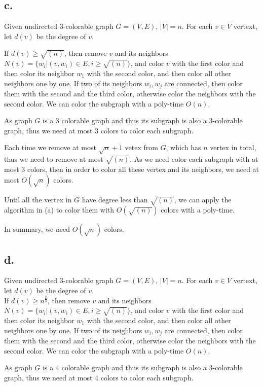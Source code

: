 \documentclass[a4paper,12pt]{article}
\begin{document}
\subsection*{c.}
Given undirected 3-colorable graph $G=(V,E)$,  $|V|=n$.
For each $v \in V$ vertext, let $d(v)$ be the degree of $v$.

If $d(v)\geq \sqrt{(n)}$, then remove $v$ and its neighbors $N(v)=\{w_i| (v,w_i) \in E, i\geq \sqrt{(n)}\}$, and color $v$ with the first color and then color its neighbor $w_1$ with the second color, and then color all other neighbors one by one. If two of its neighbors $w_i, w_j$ are connected, then color them with the second and the third color, otherwise color the neighbors with the second color. We can color the subgraph with a poly-time $O(n)$.

As graph $G$ is a 3 colorable graph and thus its subgraph is also a 3-colorable graph, thus we need at most 3 colors to color each subgraph. 

Each time we remove at most $\sqrt{n}+1$ vetex from $G$, which has $n$ vertex in total, thus we need to remove at most $ \sqrt{(n)} $. As we need color each subgraph with at most 3 colors, then in order to color all these vertex and its neighbors, we need at most $O(\sqrt{n})$ colors. 

Until all the vertex in $G$ have degree less than $\sqrt{(n)}$, we can apply the algorithm in (a) to color them with $O(\sqrt{(n)})$ colors with a poly-time.

In summary, we need $O(\sqrt{n}) $ colors.
\subsection*{d.}
Given undirected 3-colorable graph $G=(V,E)$,  $|V|=n$.
For each $v \in V$ vertext, let $d(v)$ be the degree of $v$.\\
If $d(v)\geq n^{\frac{2}{3}}$, then remove $v$ and its neighbors $N(v)=\{w_i| (v,w_i) \in E, i\geq \sqrt{(n)}\}$, and color $v$ with the first color and then color its neighbor $w_1$ with the second color, and then color all other neighbors one by one. If two of its neighbors $w_i, w_j$ are connected, then color them with the second and the third color, otherwise color the neighbors with the second color. We can color the subgraph with a poly-time $O(n)$.

As graph $G$ is a 4 colorable graph and thus its subgraph is also a 3-colorable graph, thus we need at most 4 colors to color each subgraph. 
\end{document}
